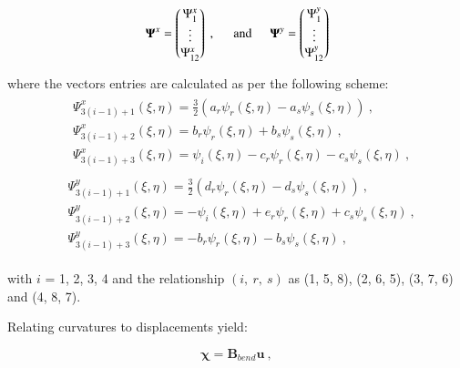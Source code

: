 \begin{equation} 
\mathbf{\Psi}^x = 
\begin{pmatrix}
\Psi_1^x \\
\vdots \\
\Psi_{12}^x
\end{pmatrix}\ ,
\hspace{5mm}
\text{and}
\hspace{5mm}
\mathbf{\Psi}^y = 
\begin{pmatrix}
\Psi_1^y \\
\vdots \\
\Psi_{12}^y
\end{pmatrix}
\label{equation24}
\end{equation}

where the vectors entries are calculated as per the following scheme:
\begin{gather} 
	\begin{aligned}
		&\Psi_{3(i-1)+1}^x (\xi , \eta) = \frac{3}{2} (a_r \psi_r (\xi , \eta) - a_s \psi_s (\xi , \eta) ) \ ,
		\\
		&\Psi_{3(i-1)+2}^x (\xi , \eta) = b_r \psi_r (\xi , \eta) + b_s \psi_s (\xi , \eta) \ ,
		\\
		&\Psi_{3(i-1)+3}^x (\xi , \eta) = \psi_i (\xi , \eta) - c_r \psi_r (\xi , \eta) - c_s \psi_s (\xi , \eta)
		\label{equation25}\ ,
	\end{aligned}
\end{gather}
\begin{gather} 
	\begin{aligned}
		&\Psi_{3(i-1)+1}^y (\xi , \eta) = \frac{3}{2} (d_r \psi_r (\xi , \eta) - d_s \psi_s (\xi , \eta) ) \ ,
		\\
		&\Psi_{3(i-1)+2}^y (\xi , \eta) = -\psi_i (\xi , \eta) + e_r \psi_r (\xi , \eta) + c_s \psi_s (\xi , \eta) \ ,
		\\
		&\Psi_{3(i-1)+3}^y (\xi , \eta) = -b_r \psi_r (\xi , \eta) - b_s \psi_s (\xi , \eta)
		\label{equation26}\ ,
	\end{aligned}
\end{gather}

with $i$ = 1, 2, 3, 4 and the relationship $(i,\ r,\ s)$ as (1, 5, 8), (2, 6, 5), (3, 7, 6) and (4, 8, 7).

Relating curvatures to displacements yield:

\begin{equation} 
\boldsymbol{\chi} = \mathbf{B}_{bend} \mathbf{u}
\label{equation27}\ ,
\end{equation}

